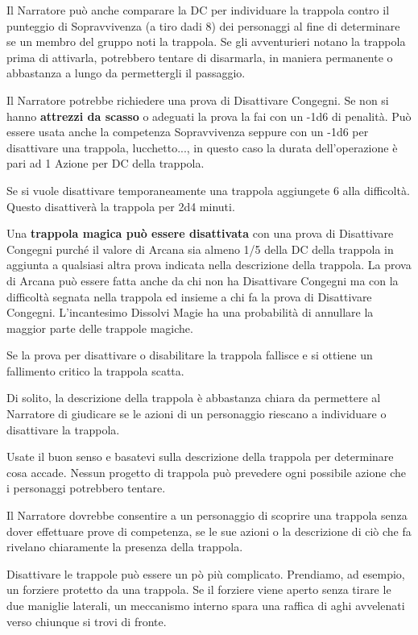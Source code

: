 \begin{multicols}{2}
Il Narratore può anche comparare la DC per individuare la trappola contro il punteggio di Sopravvivenza (a tiro dadi 8) dei personaggi al fine di determinare se un membro del gruppo noti la trappola. Se gli avventurieri notano la trappola prima di attivarla, potrebbero tentare di disarmarla, in maniera permanente o abbastanza a lungo da permettergli il passaggio.

Il Narratore potrebbe richiedere una prova di Disattivare Congegni. Se non si hanno \textbf{attrezzi da scasso} o adeguati la prova la fai con un -1d6 di penalità. Può essere usata anche la competenza Sopravvivenza seppure con un -1d6 per disattivare una trappola, lucchetto..., in questo caso la durata dell'operazione è pari ad 1 Azione per DC della trappola.

Se si vuole disattivare temporaneamente una trappola aggiungete 6 alla difficoltà. Questo disattiverà la trappola per 2d4 minuti.

Una \textbf{trappola magica può essere disattivata} con una prova di Disattivare Congegni purché il valore di Arcana sia almeno 1/5 della DC della trappola in aggiunta a qualsiasi altra prova indicata nella descrizione della trappola. La prova di Arcana può essere fatta anche da chi non ha Disattivare Congegni ma con la difficoltà segnata nella trappola ed insieme a chi fa la prova di Disattivare Congegni. L'incantesimo Dissolvi Magie ha una probabilità di annullare la maggior parte delle trappole magiche.

Se la prova per disattivare o disabilitare la trappola fallisce e si ottiene un fallimento critico la trappola scatta.

Di solito, la descrizione della trappola è abbastanza chiara da permettere al Narratore di giudicare se le azioni di un personaggio riescano a individuare o disattivare la trappola.

Usate il buon senso e basatevi sulla descrizione della trappola per determinare cosa accade. Nessun progetto di trappola può prevedere ogni possibile azione che i personaggi potrebbero tentare.

Il Narratore dovrebbe consentire a un personaggio di scoprire una trappola senza dover effettuare prove di competenza, se le sue azioni o la descrizione di ciò che fa rivelano chiaramente la presenza della trappola.

Disattivare le trappole può essere un pò più complicato. Prendiamo, ad esempio, un forziere protetto da una trappola. Se il forziere viene aperto senza tirare le due maniglie laterali, un meccanismo interno spara una raffica di aghi avvelenati verso chiunque si trovi di fronte.


\end{multicols}
